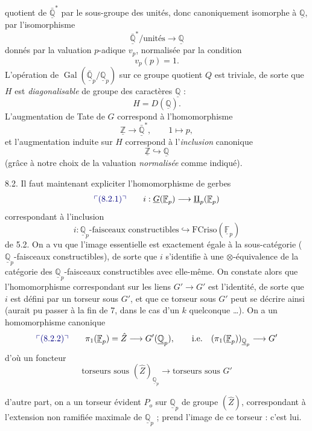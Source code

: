 \documentclass[11pt,a4paper]{article}
\begin{document}
quotient de $\bar{\underline{\mathbb{Q}}}^{*}$ par le sous-groupe des unités,
donc canoniquement isomorphe à $\underline{\mathbb{Q}}$, par l'isomorphisme
\[
\bar{\underline{\mathbb{Q}}}^{*}/\text{unités} \longrightarrow
\underline{\mathbb{Q}}
\]
donnés par la valuation $p$-adique $v_{p}$, normalisée par la condition
\[
v_{p}(p) = 1 .
\]
L'opération de \struck{\ill{}}
$\operatorname{Gal}(\bar{\underline{\mathbb{Q}}}_{p}/\underline{\mathbb{Q}}_{p})$
sur ce groupe quotient $Q$ est triviale, de sorte que $H$ est
\emph{diagonalisable} de groupe des caractères $\underline{\mathbb{Q}}$ :
\[
H = D(\underline{\mathbb{Q}}) .
\]
L'augmentation de Tate de $G$ correspond à l'homomorphisme
\[
\underline{\mathbb{Z}} \longrightarrow \bar{\underline{\mathbb{Q}}}^{*} ,
\qquad 1 \longmapsto p ,
\]
et l'augmentation induite sur $H$ correspond à l'\emph{inclusion}
canonique
\[
\underline{\mathbb{Z}} \hookrightarrow \underline{\mathbb{Q}}
\]
(grâce à notre choix de la valuation \emph{normalisée} comme indiqué).

8.2. \quad Il faut maintenant expliciter l'homomorphisme de gerbes
\[
\add{(8.2.1)} \qquad i : \underline{G}(\underline{\mathbb{F}}_{p})
\longrightarrow \underline{\Pi}_{p}(\underline{\mathbb{F}}_{p})
\]
correspondant à l'inclusion
\[
i : \underline{\mathbb{Q}}_{p}\text{-faisceaux constructibles}
\hookrightarrow \mathrm{FCriso}(\underline{\mathbb{F}}_{p})
\]
de 5.2. On a vu que l'image essentielle est exactement égale à la
sous-catégorie  ($\underline{\mathbb{Q}}_{p}$-faisceaux
constructibles), \struck{\ill{}} de sorte que $i$ s'identifie à une
\struck{\ill{}} $\otimes$-équivalence de la catégorie des
$\underline{\mathbb{Q}}_{p}$-faisceaux constructibles avec elle-même. On
constate alors que l'homomorphisme correspondant sur les liens
\struck{\ill{}} $G' \to G'$ est l'identité, \struck{\ill{}} de sorte que $i$
est défini par un torseur sous $G'$, et que ce torseur sous $G'$ peut se
décrire ainsi (aurait pu passer à la fin de 7, dans le cas d'un $k$
quelconque …). On a un homomorphisme canonique
\[
\add{(8.2.2)} \qquad \pi_{1}(\underline{\mathbb{F}}_{p}) = \hat{Z}
\longrightarrow G'(\underline{\mathbb{Q}}_{p}) , \qquad \text{i.e.}\quad
(\pi_{1}(\underline{\mathbb{F}}_{p}))_{\underline{\mathbb{Q}}_{p}}
\longrightarrow G'
\]
d'où un  foncteur
\[
\text{torseurs sous } (\hat{Z})_{\underline{\mathbb{Q}}_{p}}
\longrightarrow \text{torseurs sous } G'
\]

d'autre part, on a un torseur évident $P_{o}$ sur
$\underline{\mathbb{Q}}_{p}$ de groupe $(\hat{Z})$, correspondant à
l'extension non ramifiée maximale de $\underline{\mathbb{Q}}_{p}$ ; 
prend l'image  de ce torseur : c'est lui.
\end{document}
